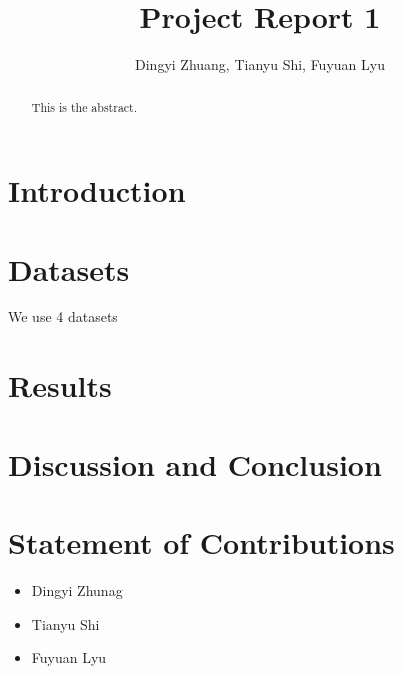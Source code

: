 \documentclass[]{scrartcl}
\title{Project Report 1}
\author{Dingyi Zhuang, Tianyu Shi, Fuyuan Lyu}
\begin{document}
\maketitle

\begin{abstract}
This is the abstract.
\end{abstract}

\section{Introduction}

\section{Datasets}
We use 4 datasets
\section{Results}

\section{Discussion and Conclusion}

\section{Statement of Contributions}

\begin{itemize}
	\item Dingyi Zhunag
	\item Tianyu Shi
	\item Fuyuan Lyu
\end{itemize}
\end{document}
